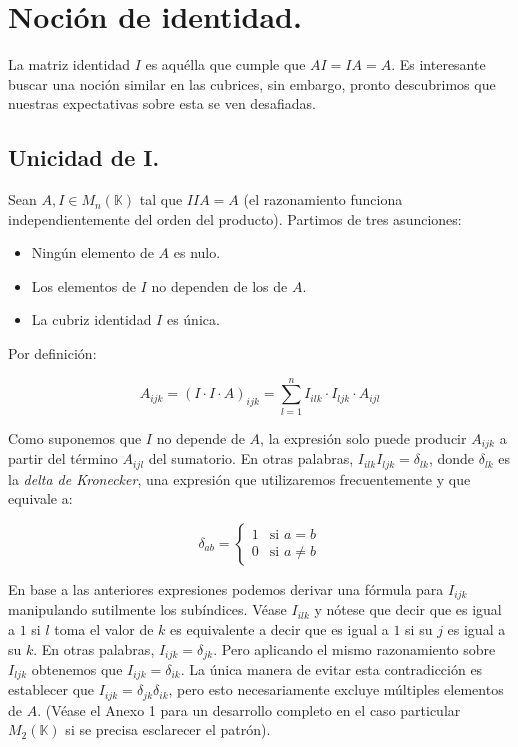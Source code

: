 \section{Noción de identidad.}

La matriz identidad $I$ es aquélla que cumple que $AI = IA = A$. Es interesante buscar una noción similar en las cubrices, sin embargo, pronto descubrimos que nuestras expectativas sobre esta se ven desafiadas.

\subsection{Unicidad de I.}

Sean $A, I \in M_{n} (\mathbb{K})$ tal que $IIA = A$ (el razonamiento funciona independientemente del orden del producto). Partimos de tres asunciones:

\begin{itemize}
	\item Ningún elemento de $A$ es nulo.
	\item Los elementos de $I$ no dependen de los de $A$.
	\item La cubriz identidad $I$ es única.
\end{itemize}

Por definición:

$$A_{ijk} = (I \cdot I \cdot A)_{ijk} = \sum\limits_{l=1}^{n} I_{ilk} \cdot I_{ljk} \cdot A_{ijl}$$

Como suponemos que $I$ no depende de $A$, la expresión solo puede producir $A_{ijk}$ a partir del término $A_{ijl}$ del sumatorio. En otras palabras, $I_{ilk} I_{ljk} = \delta_{lk}$, donde $\delta_{lk}$ es la \textit{delta de Kronecker}, una expresión que utilizaremos frecuentemente y que equivale a:

\begin{equation}
	\delta_{ab} =
	\begin{cases}
		1 & \text{si } a = b \\
		0 & \text{si } a \neq b
	\end{cases}
\end{equation}

En base a las anteriores expresiones podemos derivar una fórmula para $I_{ijk}$ manipulando sutilmente los subíndices. Véase $I_{ilk}$ y nótese que decir que es igual a $1$ si $l$ toma el valor de $k$ es equivalente a decir que es igual a $1$ si su $j$ es igual a su $k$. En otras palabras, $I_{ijk} = \delta_{jk}$. Pero aplicando el mismo razonamiento sobre $I_{ljk}$ obtenemos que $I_{ijk} = \delta_{ik}$. La única manera de evitar esta contradicción es establecer que $I_{ijk} = \delta_{jk} \delta_{ik}$, pero esto necesariamente excluye múltiples elementos de $A$. (Véase el Anexo 1 para un desarrollo completo en el caso particular $M_2 (\mathbb{K})$ si se precisa esclarecer el patrón).

